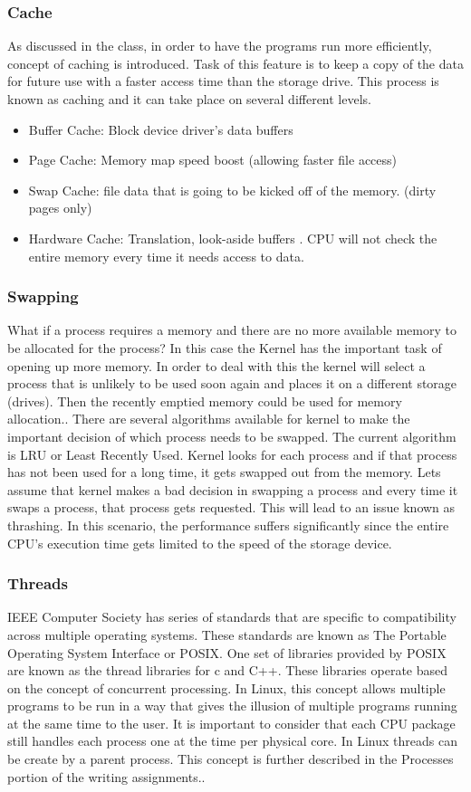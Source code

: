 \documentclass[journal,10pt,onecolumn,compsoc,letterpaper,draftclsnofoot,table,xcdraw]{IEEEtran} \usepackage[margin=0.75in]{geometry}
\begin{document}
\subsubsection{Cache}
\noindent As discussed in the class, in order to have the programs run more efficiently, concept of caching is introduced. Task of this feature is to keep a copy of the data for future use with a faster access time than the storage drive. This process is known as caching and it can take place on several different levels.
\begin{itemize}
\item Buffer Cache: Block device driver's data buffers \label{BC}
\item Page Cache: Memory map speed boost (allowing faster file access)
\item Swap Cache: file data that is going to be kicked off of the memory. (dirty pages only)
\item Hardware Cache: Translation, look-aside buffers \cite{1}. CPU will not check the entire memory every time it needs access to data.\label{HWC}
\end{itemize}
\subsubsection{Swapping}
\noindent What if a process requires a memory and there are no more available memory to be allocated for the process? In this case the Kernel has the important task of opening up more memory. In order to deal with this the kernel will select a process that is unlikely to be used soon again and places it on a different storage (drives). Then the recently emptied memory could be used for memory allocation.\cite{1}. There are several algorithms available for kernel to make the important decision of which process needs to be swapped. The current algorithm is LRU or Least Recently Used. Kernel looks for each process and if that process has not been used for a long time, it gets swapped out from the memory.
\noindent Lets assume that kernel makes a bad decision in swapping a process and every time it swaps a process, that process gets requested. This will lead to an issue known as thrashing. In this scenario, the performance suffers significantly since the entire CPU's execution time gets limited to the speed of the storage device.
\subsubsection{Threads}
\noindent IEEE Computer Society has series of standards that are specific to compatibility across multiple operating systems. These standards are known as The Portable Operating System Interface or POSIX. One set of libraries provided by POSIX are known as the thread libraries for c and C++. These libraries operate based on the concept of concurrent processing. In Linux, this concept allows multiple programs to be run in  a way that gives the illusion of multiple programs running at the same time to the user. It is important to consider that each CPU package still handles each process one at the time per physical core. In Linux threads can be create by a parent process. This concept is further described in the Processes portion of the writing assignments.\cite{3}.
\end{document}
